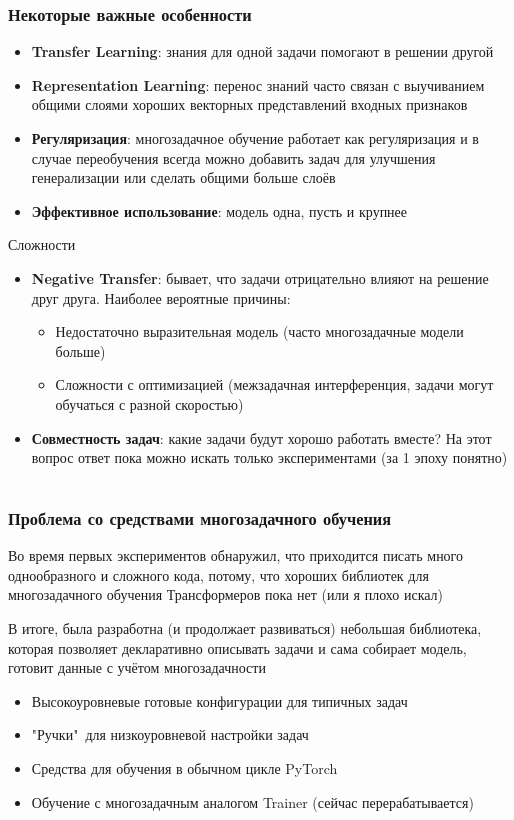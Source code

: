 \documentclass[aspectratio=169]{beamer}
\begin{document}
\begin{frame}
\frametitle{Некоторые важные особенности}
\begin{itemize}
	\item \textbf{Transfer Learning}: знания для одной задачи помогают в решении другой
	\item \textbf{Representation Learning}: перенос знаний часто связан с выучиванием общими слоями хороших векторных представлений входных признаков
	\item \textbf{Регуляризация}: многозадачное обучение работает как регуляризация и в случае переобучения всегда можно добавить задач для улучшения генерализации или сделать общими больше слоёв
	\item \textbf{Эффективное использование}: модель одна, пусть и крупнее
\end{itemize}
Сложности
\begin{itemize}
	\item \textbf{Negative Transfer}: бывает, что задачи отрицательно влияют на решение друг друга. Наиболее вероятные причины:
	\begin{itemize}
		\item Недостаточно выразительная модель (часто многозадачные модели больше)
		\item Сложности с оптимизацией (межзадачная интерференция, задачи могут обучаться с разной скоростью)
	\end{itemize}
	\item \textbf{Совместность задач}: какие задачи будут хорошо работать вместе? На этот вопрос ответ пока можно искать только экспериментами (за 1 эпоху понятно)
\end{itemize}
\end{frame}

\section[Разработка модуля]{}

\begin{frame}
	\frametitle{Проблема со средствами многозадачного обучения}
	Во время первых экспериментов обнаружил, что приходится писать много однообразного и сложного кода, потому, что хороших библиотек для многозадачного обучения Трансформеров пока нет (или я плохо искал)

	В итоге, была разработна (и продолжает развиваться) небольшая библиотека, которая позволяет декларативно описывать задачи и сама собирает модель, готовит данные с учётом многозадачности
	\begin{itemize}
		\item Высокоуровневые готовые конфигурации для типичных задач
		\item "Ручки"\ для низкоуровневой настройки задач
		\item Средства для обучения в обычном цикле PyTorch
		\item Обучение с многозадачным аналогом Trainer (сейчас перерабатывается)
	\end{itemize}
\end{frame}
\end{document}
